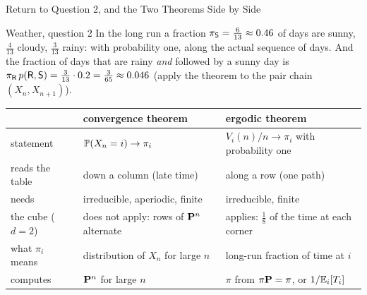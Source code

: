\begin{frame}{Return to Question 2, and the Two Theorems Side by Side}
  \label{fr:sidebyside}
  \small
  \begin{exampleblock}{Weather, question 2}
    In the long run a fraction $\pi_{\mathsf{S}}=\tfrac6{13}\approx0.46$ of days are sunny, $\tfrac4{13}$ cloudy, $\tfrac3{13}$ rainy: with probability one, along the actual sequence of days. And the fraction of days that are rainy \emph{and} followed by a sunny day is $\pi_{\mathsf{R}}\,p(\mathsf{R},\mathsf{S})=\tfrac3{13}\cdot0.2=\tfrac3{65}\approx0.046$ (apply the theorem to the pair chain $(X_n,X_{n+1})$).
  \end{exampleblock}
  \begin{center}
    \renewcommand{\arraystretch}{1.4}
    \begin{tabular}{@{}lll@{}}
      \toprule
      & convergence theorem & ergodic theorem \\
      \midrule
      statement & $\mathbb{P}(X_n=i)\to\pi_i$ & $V_i(n)/n\to\pi_i$ with probability one \\
      reads the table & down a column (late time) & along a row (one path) \\
      needs & irreducible, aperiodic, finite & irreducible, finite \\
      the cube ($d=2$) & does not apply: rows of $\mathbf{P}^n$ alternate & applies: $\tfrac18$ of the time at each corner \\
      what $\pi_i$ means & distribution of $X_n$ for large $n$ & long-run fraction of time at $i$ \\
      computes & $\mathbf{P}^n$ for large $n$ & $\pi$ from $\pi\mathbf{P}=\pi$, or $1/\mathbb{E}_i[T_i]$ \\
      \bottomrule
    \end{tabular}
  \end{center}
\end{frame}



